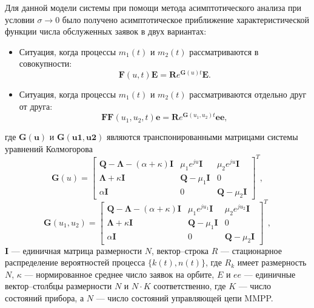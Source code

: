 Для данной модели системы при помощи метода асимптотического анализа при условии $\sigma \xrightarrow{} 0$ было получено асимптотическое приближение характеристической функции числа обслуженных заявок в двух вариантах:
\begin{itemize}
	\item Ситуация, когда процессы $m_1(t)$ и $m_2(t)$ рассматриваются в совокупности:
	\begin{equation}
	\boldsymbol{F}(u,t)\boldsymbol{E}=\boldsymbol{R}e^{\boldsymbol{G}(u)t}\boldsymbol{E}.
	\end{equation}
	\item Ситуация, когда процессы $m_1(t)$ и $m_2(t)$ рассматриваются отдельно друг от друга:
	\begin{equation}
		\boldsymbol{FF}(u_{1},u_{2},t)\boldsymbol{e}=\boldsymbol{R}e^{\boldsymbol{G}(u_{1},u_{2})t}\boldsymbol{ee},
	\end{equation}
\end{itemize}
где $\boldsymbol{G(u)}$ и $\boldsymbol{G(u1,u2)}$ являются транспонированными матрицами системы уравнений Колмогорова
\begin{equation*}
	\boldsymbol{G}(u)=\begin{bmatrix}
		\boldsymbol{Q}-\boldsymbol{\Lambda}-(\alpha + \kappa)\boldsymbol{I} & \mu_{1}e^{ju}\boldsymbol{I} &  \mu_{2}e^{ju}\boldsymbol{I}\\
		\boldsymbol{\Lambda}+\kappa\boldsymbol{I} & \boldsymbol{Q}-\mu_{1}\boldsymbol{I} & 0\\
		\alpha\boldsymbol{I} & 	0 &	\boldsymbol{Q}-\mu_{2}\boldsymbol{I}
	\end{bmatrix}^{T},
\end{equation*}
\begin{equation*}
\boldsymbol{G}(u_{1},u_{2})=\begin{bmatrix}
	\boldsymbol{Q}-\boldsymbol{\Lambda}-(\alpha + \kappa)\boldsymbol{I} & \mu_{1}e^{ju_{1}}\boldsymbol{I} &  \mu_{2}e^{ju_{2}}\boldsymbol{I}\\
	\boldsymbol{\Lambda}+\kappa\boldsymbol{I} & \boldsymbol{Q}-\mu_{1}\boldsymbol{I} & 0\\
	\alpha\boldsymbol{I} & 	0 &	\boldsymbol{Q}-\mu_{2}\boldsymbol{I}
\end{bmatrix}^{T},
\end{equation*}
$\boldsymbol{I}$ --- единичная матрица размерности $N$, вектор--строка $R$ --- стационарное распределение вероятностей процесса $\{k(t),n(t)\}$, где $R_k$ имеет размерность $N$, $\kappa$ --- нормированное среднее число заявок на орбите, $E$ и $ee$ --- единичные вектор--столбцы размерности $N$ и $N \cdot K$ соответственно, где $K$ --- число состояний прибора, а $N$ --- число состояний управляющей цепи MMPP.

